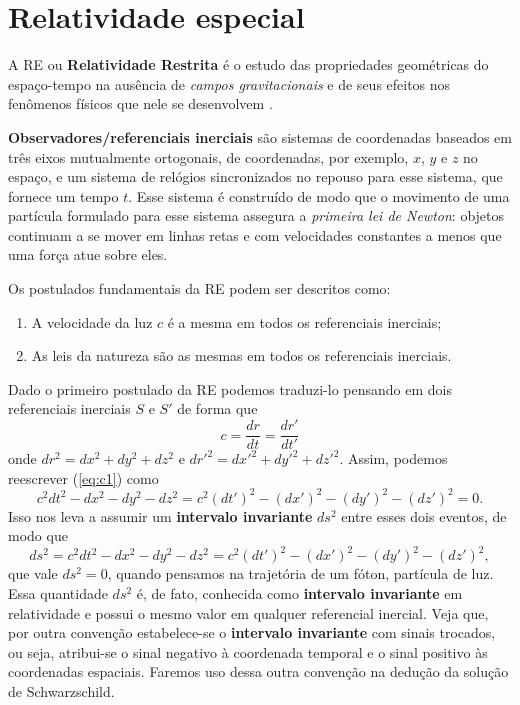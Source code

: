 \documentclass[12pt,a4paper,titlepage,brazil]{article}
\begin{document}
\section{Relatividade especial}

A RE ou {\bf Relatividade Restrita} é o estudo das propriedades geométricas do espaço-tempo na ausência de {\em campos gravitacionais} e de seus efeitos nos fenômenos físicos que nele se desenvolvem \cite{particulas, nightingale2006, carroll2004}.\\

\begin{tcolorbox}
 {\bf Observadores/referenciais inerciais} são sistemas de coordenadas baseados em três eixos mutualmente ortogonais, de coordenadas, por exemplo, $x$, $y$ e $z$ no espaço, e um sistema de relógios sincronizados no repouso para esse sistema, que fornece um tempo $t$. Esse sistema é construído de modo que o movimento de uma partícula formulado para esse sistema assegura a {\em primeira lei de Newton}: objetos continuam a se mover em linhas retas e com velocidades constantes a menos que uma força atue sobre eles. 
\end{tcolorbox}

Os postulados fundamentais da RE podem ser descritos como:
\begin{enumerate}
 \item A velocidade da luz $c$ é a mesma em todos os referenciais inerciais;
 \item As leis da natureza são as mesmas em todos os referenciais inerciais.
\end{enumerate}  

Dado o primeiro postulado da RE podemos traduzi-lo pensando em dois referenciais inerciais $S$ e $S'$ de forma que
\begin{equation}
 c = \frac{d r}{ d t} = \frac{d r'}{d t'} \label{eq:c1}
\end{equation}  
onde $dr^2 = dx^2 + dy^2 + dz^2$ e $dr'^2 = dx'^2 + dy'^2 + dz'^2$. Assim, podemos reescrever (\ref{eq:c1}) como
\begin{equation}
 c^2 d t^2 - d x^2 - d y^2 - d z^2 = c^2 (d t')^2 - (d x')^2 - (d y')^2 - (d z')^2 = 0 .
\end{equation}
Isso nos leva a assumir um {\bf intervalo invariante} $d s^2$ entre esses dois eventos, de modo que
\begin{equation}
 d s^2 = c^2 d t^2 - d x^2 - d y^2 - d z^2 = c^2 (d t')^2 - (d x')^2 - (d y')^2 - (d z')^2 , \label{eq:ds2}
\end{equation}
que vale $d s^2 = 0$, quando pensamos na trajetória de um fóton, partícula de luz. Essa quantidade $d s^2$ é, de fato, conhecida como {\bf intervalo invariante} em relatividade e possui o mesmo valor em qualquer referencial inercial. Veja que, por outra convenção estabelece-se o {\bf intervalo invariante} com sinais trocados, ou seja, atribui-se o sinal negativo à coordenada temporal e o sinal positivo às coordenadas espaciais. Faremos uso dessa outra convenção na dedução da solução de Schwarzschild.
\end{document}
